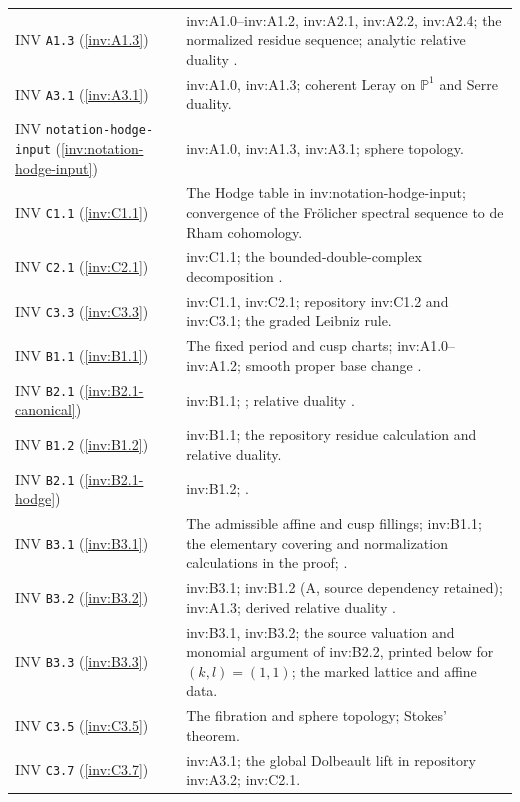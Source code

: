 \begin{longtable}{@{}L{.21\linewidth}L{.73\linewidth}@{}}
INV \nolinkurl{A1.3} (\ref{inv:A1.3}) & inv:A1.0--inv:A1.2, inv:A2.1, inv:A2.2, inv:A2.4; the normalized residue sequence; analytic relative duality \cite{RRV71}.\\
INV \nolinkurl{A3.1} (\ref{inv:A3.1}) & inv:A1.0, inv:A1.3; coherent Leray on $\mathbb P^1$ and Serre duality.\\
INV \nolinkurl{notation-hodge-input} (\ref{inv:notation-hodge-input}) & inv:A1.0, inv:A1.3, inv:A3.1; sphere topology.\\
INV \nolinkurl{C1.1} (\ref{inv:C1.1}) & The Hodge table in inv:notation-hodge-input; convergence of the Fr\"olicher spectral sequence to de Rham cohomology.\\
INV \nolinkurl{C2.1} (\ref{inv:C2.1}) & inv:C1.1; the bounded-double-complex decomposition \cite[Theorem 3 and Proposition 6(1)]{Stelzig21}.\\
INV \nolinkurl{C3.3} (\ref{inv:C3.3}) & inv:C1.1, inv:C2.1; repository inv:C1.2 and inv:C3.1; the graded Leibniz rule.\\
INV \nolinkurl{B1.1} (\ref{inv:B1.1}) & The fixed period and cusp charts; inv:A1.0--inv:A1.2; smooth proper base change \cite[III.4.12]{BS76}.\\
INV \nolinkurl{B2.1} (\ref{inv:B2.1-canonical}) & inv:B1.1; \cite[Theorem 1.1 and Proposition 2.3]{VL26}; relative duality \cite{RRV71}.\\
INV \nolinkurl{B1.2} (\ref{inv:B1.2}) & inv:B1.1; the repository residue calculation and relative duality.\\
INV \nolinkurl{B2.1} (\ref{inv:B2.1-hodge}) & inv:B1.2; \cite[Theorem 1.1 and Proposition 2.3]{VL26}.\\
INV \nolinkurl{B3.1} (\ref{inv:B3.1}) & The admissible affine and cusp fillings; inv:B1.1; the elementary covering and normalization calculations in the proof; \cite[III.4.12]{BS76}.\\
INV \nolinkurl{B3.2} (\ref{inv:B3.2}) & inv:B3.1; inv:B1.2 (A, source dependency retained); inv:A1.3; derived relative duality \cite{RRV71}.\\
INV \nolinkurl{B3.3} (\ref{inv:B3.3}) & inv:B3.1, inv:B3.2; the source valuation and monomial argument of inv:B2.2, printed below for $(k,l)=(1,1)$; the marked lattice and affine data.\\
INV \nolinkurl{C3.5} (\ref{inv:C3.5}) & The fibration and sphere topology; Stokes’ theorem.\\
INV \nolinkurl{C3.7} (\ref{inv:C3.7}) & inv:A3.1; the global Dolbeault lift in repository inv:A3.2; inv:C2.1.\\

\end{longtable}
